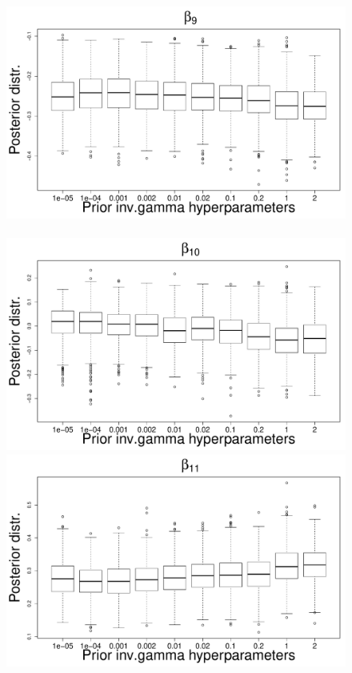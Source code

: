 \documentclass{statsoc}
\begin{document}
\begin{figure}
\centering

\includegraphics[scale=0.25]{Sensitivity/beta_9_sensitivity.pdf}~
\includegraphics[scale=0.25]{Sensitivity/beta_10_sensitivity.pdf}\\
\includegraphics[scale=0.25]{Sensitivity/beta_11_sensitivity.pdf}~

\end{figure}
\end{document}
